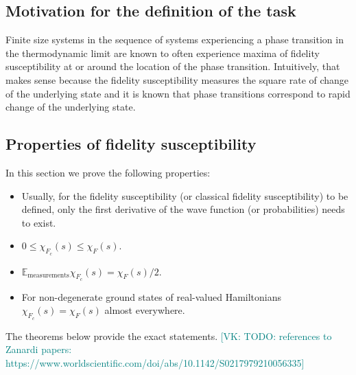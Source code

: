 \documentclass[american,aps,pra,reprint,floatfix,nofootinbib,superscriptaddress]{revtex4-2}
\newcommand{\VK}[1]{\textcolor{teal}{[VK: #1]}}
\begin{document}
\subsection{Motivation for the definition of the task}
Finite size systems in the sequence of systems experiencing a phase transition
in the thermodynamic limit are known to often experience maxima of fidelity susceptibility at or around the location of the phase transition. Intuitively, that
makes sense because the fidelity susceptibility measures the square rate of change of the underlying state and it is known that phase transitions correspond to rapid change of the underlying state.

\subsection{Properties of fidelity susceptibility}
In this section we
prove the following properties:
\begin{itemize}
  \item Usually, for the fidelity susceptibility (or classical fidelity
    susceptibility) to be defined, only 
    the first
    derivative of the wave function
    (or probabilities) needs to exist.
  \item $0 \leq \chi_{F_c}(s) \leq \chi_F(s)$.
  \item $\mathbb{E}_{\textrm{measurements}} \chi_{F_c}(s) = \chi_F(s)/2$.
  \item For non-degenerate ground states of real-valued Hamiltonians
  $\chi_{F_c}(s) = \chi_F(s)$ almost everywhere.
\end{itemize}
The theorems below provide 
the exact statements.
\VK{TODO: references to Zanardi papers: https://www.worldscientific.com/doi/abs/10.1142/S0217979210056335}
\end{document}
